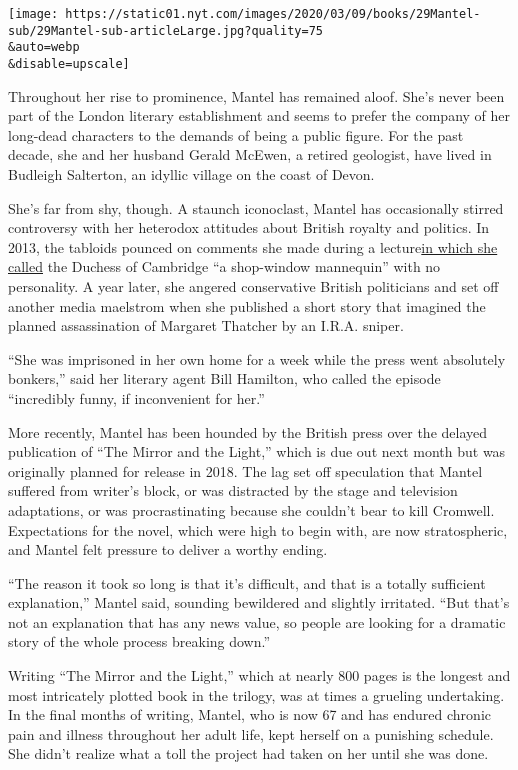 \texttt{[image: https://static01.nyt.com/images/2020/03/09/books/29Mantel-sub/29Mantel-sub-articleLarge.jpg?quality=75\\\&auto=webp\\\&disable=upscale]}

Throughout her rise to prominence, Mantel has remained aloof. She's
never been part of the London literary establishment and seems to prefer
the company of her long-dead characters to the demands of being a public
figure. For the past decade, she and her husband Gerald McEwen, a
retired geologist, have lived in Budleigh Salterton, an idyllic village
on the coast of Devon.

She's far from shy, though. A staunch iconoclast, Mantel has
occasionally stirred controversy with her heterodox attitudes about
British royalty and politics. In 2013, the tabloids pounced on comments
she made during a
lecture\href{https://www.theguardian.com/uk/2013/feb/19/kate-duchess-cambridge-hilary-mantel}{in
which she called} the Duchess of Cambridge ``a shop-window mannequin''
with no personality. A year later, she angered conservative British
politicians and set off another media maelstrom when she published a
short story that imagined the planned assassination of Margaret Thatcher
by an I.R.A. sniper.

``She was imprisoned in her own home for a week while the press went
absolutely bonkers,'' said her literary agent Bill Hamilton, who called
the episode ``incredibly funny, if inconvenient for her.''

More recently, Mantel has been hounded by the British press over the
delayed publication of ``The Mirror and the Light,'' which is due out
next month but was originally planned for release in 2018. The lag set
off speculation that Mantel suffered from writer's block, or was
distracted by the stage and television adaptations, or was
procrastinating because she couldn't bear to kill Cromwell. Expectations
for the novel, which were high to begin with, are now stratospheric, and
Mantel felt pressure to deliver a worthy ending.

``The reason it took so long is that it's difficult, and that is a
totally sufficient explanation,'' Mantel said, sounding bewildered and
slightly irritated. ``But that's not an explanation that has any news
value, so people are looking for a dramatic story of the whole process
breaking down.''

Writing ``The Mirror and the Light,'' which at nearly 800 pages is the
longest and most intricately plotted book in the trilogy, was at times a
grueling undertaking. In the final months of writing, Mantel, who is now
67 and has endured chronic pain and illness throughout her adult life,
kept herself on a punishing schedule. She didn't realize what a toll the
project had taken on her until she was done.

